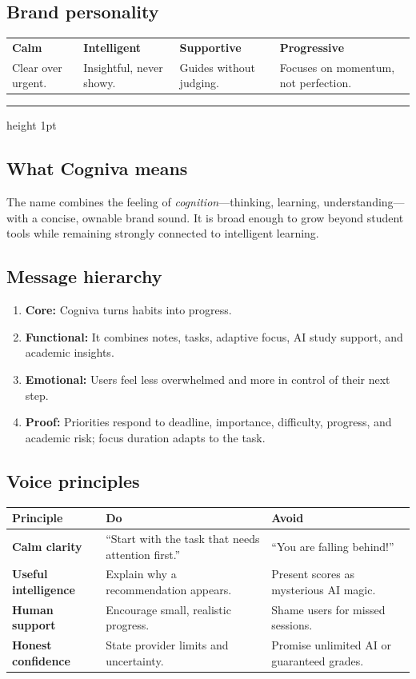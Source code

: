 \documentclass[11pt,a4paper]{article}
\newcommand{\sectiontitle}[1]{\vspace{4pt}{\color{CognivaForest}\LARGE\bfseries #1}\par\vspace{5pt}\hrule height 1pt\vspace{10pt}}
\begin{document}
\subsection*{Brand personality}
\begin{tabularx}{\textwidth}{XXXX}
\textbf{Calm} & \textbf{Intelligent} & \textbf{Supportive} & \textbf{Progressive}\\
Clear over urgent. & Insightful, never showy. & Guides without judging. & Focuses on momentum, not perfection.\\
\end{tabularx}

\newpage\sectiontitle{02 — Naming and messaging}
\subsection*{What Cogniva means}
The name combines the feeling of \textit{cognition}—thinking, learning, understanding—with a concise, ownable brand sound. It is broad enough to grow beyond student tools while remaining strongly connected to intelligent learning.

\subsection*{Message hierarchy}
\begin{enumerate}[label=\textcolor{CognivaTeal}{\arabic*.},leftmargin=1.1cm]
\item \textbf{Core:} Cogniva turns habits into progress.
\item \textbf{Functional:} It combines notes, tasks, adaptive focus, AI study support, and academic insights.
\item \textbf{Emotional:} Users feel less overwhelmed and more in control of their next step.
\item \textbf{Proof:} Priorities respond to deadline, importance, difficulty, progress, and academic risk; focus duration adapts to the task.
\end{enumerate}

\subsection*{Voice principles}
\begin{tabularx}{\textwidth}{>{\bfseries}p{3.5cm}X X}
Principle & Do & Avoid\\\midrule
Calm clarity & “Start with the task that needs attention first.” & “You are falling behind!”\\
Useful intelligence & Explain why a recommendation appears. & Present scores as mysterious AI magic.\\
Human support & Encourage small, realistic progress. & Shame users for missed sessions.\\
Honest confidence & State provider limits and uncertainty. & Promise unlimited AI or guaranteed grades.\\
\end{tabularx}
\end{document}
